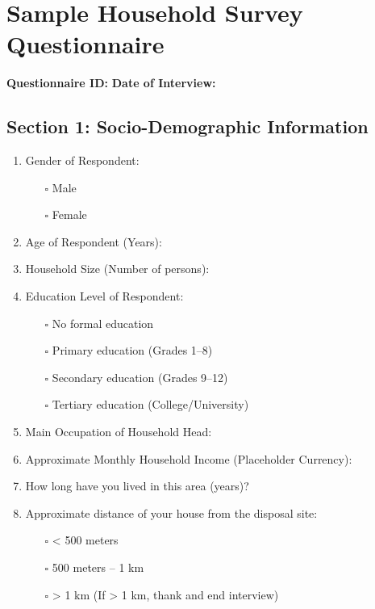 
\chapter{Sample Household Survey Questionnaire}
\label{app:questionnaire}

\textbf{Questionnaire ID:} \hrulefill \hspace{1cm}
\textbf{Date of Interview:} \hrulefill \\[1em]

\section*{Section 1: Socio-Demographic Information}

\begin{enumerate}[label=\arabic*.]
    \item Gender of Respondent:
    \begin{itemize}
        \item[$\square$] Male
        \item[$\square$] Female
    \end{itemize}

    \item Age of Respondent (Years): \hrulefill

    \item Household Size (Number of persons): \hrulefill

    \item Education Level of Respondent:
    \begin{itemize}
        \item[$\square$] No formal education
        \item[$\square$] Primary education (Grades 1--8)
        \item[$\square$] Secondary education (Grades 9--12)
        \item[$\square$] Tertiary education (College/University)
    \end{itemize}

    \item Main Occupation of Household Head: \hrulefill

    \item Approximate Monthly Household Income (Placeholder Currency): \hrulefill

    \item How long have you lived in this area (years)? \hrulefill

    \item Approximate distance of your house from the disposal site:
    \begin{itemize}
        \item[$\square$] < 500 meters
        \item[$\square$] 500 meters -- 1 km
        \item[$\square$] > 1 km \quad (If > 1 km, thank and end interview)
    \end{itemize}
\end{enumerate}

